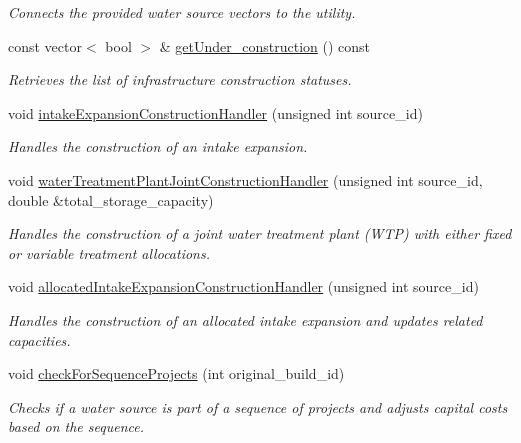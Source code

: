 \begin{DoxyCompactItemize}
\begin{DoxyCompactList}\small\item\em Connects the provided water source vectors to the utility. \end{DoxyCompactList}\item 
const vector$<$ bool $>$ \& \mbox{\hyperlink{classInfrastructureManager_ad598850bb18f5a6fc81a0e2bc7885ef2}{get\+Under\+\_\+construction}} () const
\begin{DoxyCompactList}\small\item\em Retrieves the list of infrastructure construction statuses. \end{DoxyCompactList}\item 
void \mbox{\hyperlink{classInfrastructureManager_aed62e86a9737e385c821d44ea70922e9}{intake\+Expansion\+Construction\+Handler}} (unsigned int source\+\_\+id)
\begin{DoxyCompactList}\small\item\em Handles the construction of an intake expansion. \end{DoxyCompactList}\item 
void \mbox{\hyperlink{classInfrastructureManager_a669881b881b090b3dd8fe70e3ffbf7f6}{water\+Treatment\+Plant\+Joint\+Construction\+Handler}} (unsigned int source\+\_\+id, double \&total\+\_\+storage\+\_\+capacity)
\begin{DoxyCompactList}\small\item\em Handles the construction of a joint water treatment plant (W\+TP) with either fixed or variable treatment allocations. \end{DoxyCompactList}\item 
void \mbox{\hyperlink{classInfrastructureManager_a4fc2e6e4fa74374b6669f5360dcda9d9}{allocated\+Intake\+Expansion\+Construction\+Handler}} (unsigned int source\+\_\+id)
\begin{DoxyCompactList}\small\item\em Handles the construction of an allocated intake expansion and updates related capacities. \end{DoxyCompactList}\item 
void \mbox{\hyperlink{classInfrastructureManager_a4eca31074654eb197ba33342eee3bd32}{check\+For\+Sequence\+Projects}} (int original\+\_\+build\+\_\+id)
\begin{DoxyCompactList}\small\item\em Checks if a water source is part of a sequence of projects and adjusts capital costs based on the sequence. \end{DoxyCompactList}\item 

\end{DoxyCompactItemize}
